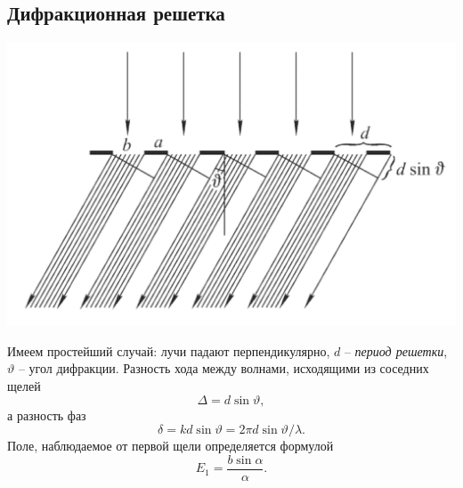 \subsection{Дифракционная решетка}
\begin{minipage}{0.45\textwidth}
    \includegraphics[width=1\textwidth]{figures/s36_1.png}
\end{minipage}
\hfill
\begin{minipage}{0.45\textwidth}
	Имеем простейший случай: лучи падают перпендикулярно, $d$ -- \textit{период решетки}, $\vartheta$ -- угол дифракции.
	Разность хода между волнами, исходящими из соседних щелей 
	\begin{equation*}
		\Delta = d \sin \vartheta, 	
	\end{equation*}
	а разность фаз 
	\begin{equation*}
		\delta = k d \sin \vartheta = 2 \pi d \sin \vartheta / \lambda.
	\end{equation*}  
	Поле, наблюдаемое от первой щели определяется формулой
	\begin{equation*}
		E_1 = \frac{b \sin\alpha}{\alpha}.
	\end{equation*}
\end{minipage}

